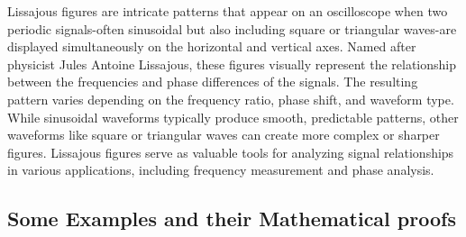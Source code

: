 Lissajous figures are intricate patterns that appear on an oscilloscope when two periodic signals-often sinusoidal but also including square or triangular waves-are displayed simultaneously on the horizontal and vertical axes. Named after physicist Jules Antoine Lissajous, these figures visually represent the relationship between the frequencies and phase differences of the signals. The resulting pattern varies depending on the frequency ratio, phase shift, and waveform type. While sinusoidal waveforms typically produce smooth, predictable patterns, other waveforms like square or triangular waves can create more complex or sharper figures. Lissajous figures serve as valuable tools for analyzing signal relationships in various applications, including frequency measurement and phase analysis.

\subsection{Some Examples and their Mathematical proofs}

